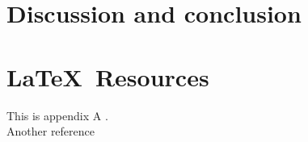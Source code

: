 \documentclass[master, copyright]{resources/class/ms_thesis}
\begin{document}
\chapter{Discussion and conclusion}
%
%
\appendix
%
\chapter{\LaTeX\ Resources}
This is appendix A \cite{ref01}.
\newline \\
Another reference \cite{ref02}
\begin{center}
  
\end{center}
%
%
%


\end{document}
